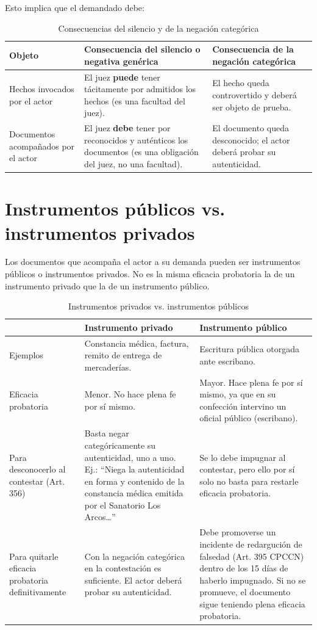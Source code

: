 \documentclass[12pt,oneside]{book}
\begin{document}
Esto implica que el demandado debe:

\begin{table}[H]
\centering
\caption{Consecuencias del silencio y de la negación categórica}
\begin{tabularx}{\textwidth}{p{} X X}
\toprule
\textbf{Objeto} & \textbf{Consecuencia del silencio o negativa genérica} & \textbf{Consecuencia de la negación categórica} \\
\midrule
Hechos invocados por el actor & El juez \textbf{puede} tener tácitamente por admitidos los hechos (es una facultad del juez). & El hecho queda controvertido y deberá ser objeto de prueba. \\
Documentos acompañados por el actor & El juez \textbf{debe} tener por reconocidos y auténticos los documentos (es una obligación del juez, no una facultad). & El documento queda desconocido; el actor deberá probar su autenticidad. \\
\bottomrule
\end{tabularx}
\end{table}

\section{Instrumentos públicos vs. instrumentos privados}

Los documentos que acompaña el actor a su demanda pueden ser instrumentos públicos o instrumentos privados. No es la misma eficacia probatoria la de un instrumento privado que la de un instrumento público.

\begin{table}[H]
\centering
\caption{Instrumentos privados vs. instrumentos públicos}
\begin{tabularx}{\textwidth}{p{} X X}
\toprule
 & \textbf{Instrumento privado} & \textbf{Instrumento público} \\
\midrule
Ejemplos & Constancia médica, factura, remito de entrega de mercaderías. & Escritura pública otorgada ante escribano. \\
Eficacia probatoria & Menor. No hace plena fe por sí mismo. & Mayor. Hace plena fe por sí mismo, ya que en su confección intervino un oficial público (escribano). \\
Para desconocerlo al contestar (Art. 356) & Basta negar categóricamente su autenticidad, uno a uno. Ej.: ``Niega la autenticidad en forma y contenido de la constancia médica emitida por el Sanatorio Los Arcos\ldots'' & Se lo debe impugnar al contestar, pero ello por sí solo no basta para restarle eficacia probatoria. \\
Para quitarle eficacia probatoria definitivamente & Con la negación categórica en la contestación es suficiente. El actor deberá probar su autenticidad. & Debe promoverse un incidente de redargución de falsedad (Art. 395 CPCCN) dentro de los 15 días de haberlo impugnado. Si no se promueve, el documento sigue teniendo plena eficacia probatoria. \\
\bottomrule
\end{tabularx}
\end{table}
\end{document}

